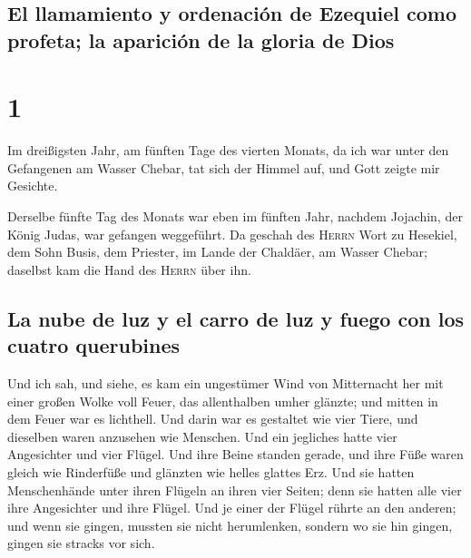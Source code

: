 \hypertarget{el-llamamiento-y-ordenaciuxf3n-de-ezequiel-como-profeta-la-apariciuxf3n-de-la-gloria-de-dios}{%
\subsection{El llamamiento y ordenación de Ezequiel como profeta; la
aparición de la gloria de
Dios}\label{el-llamamiento-y-ordenaciuxf3n-de-ezequiel-como-profeta-la-apariciuxf3n-de-la-gloria-de-dios}}

\hypertarget{section}{%
\section{1}\label{section}}

 Im dreißigsten Jahr, am fünften Tage des vierten Monats,
da ich war unter den Gefangenen am Wasser Chebar, tat sich der Himmel
auf, und Gott zeigte mir Gesichte.

 Derselbe fünfte Tag des Monats war eben im fünften Jahr,
nachdem Jojachin, der König Judas, war gefangen weggeführt.
 Da geschah des \textsc{Herrn} Wort zu Hesekiel, dem Sohn
Busis, dem Priester, im Lande der Chaldäer, am Wasser Chebar; daselbst
kam die Hand des \textsc{Herrn} über ihn.

\hypertarget{la-nube-de-luz-y-el-carro-de-luz-y-fuego-con-los-cuatro-querubines}{%
\subsection{La nube de luz y el carro de luz y fuego con los cuatro
querubines}\label{la-nube-de-luz-y-el-carro-de-luz-y-fuego-con-los-cuatro-querubines}}

 Und ich sah, und siehe, es kam ein ungestümer Wind von
Mitternacht her mit einer großen Wolke voll Feuer, das allenthalben
umher glänzte; und mitten in dem Feuer war es lichthell. 
Und darin war es gestaltet wie vier Tiere, und dieselben waren anzusehen
wie Menschen.  Und ein jegliches hatte vier Angesichter
und vier Flügel.  Und ihre Beine standen gerade, und ihre
Füße waren gleich wie Rinderfüße und glänzten wie helles glattes Erz.
 Und sie hatten Menschenhände unter ihren Flügeln an ihren
vier Seiten; denn sie hatten alle vier ihre Angesichter und ihre Flügel.
 Und je einer der Flügel rührte an den anderen; und wenn
sie gingen, mussten sie nicht herumlenken, sondern wo sie hin gingen,
gingen sie stracks vor sich.


